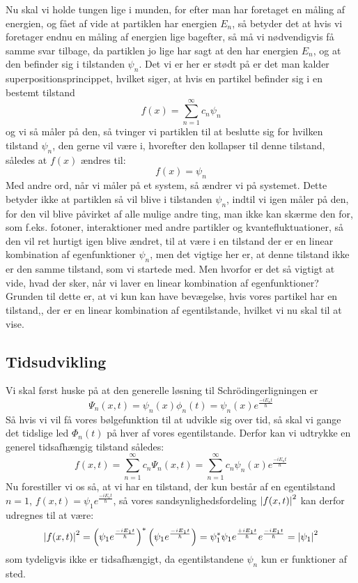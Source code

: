 \documentclass[../Kvantemekanik.tex]{subfiles}
\begin{document}
Nu skal vi holde tungen lige i munden, for efter man har foretaget en måling af energien, og fået af vide at partiklen har energien $E_n$, så betyder det at hvis vi foretager endnu en måling af energien lige bagefter, så må vi nødvendigvis få samme svar tilbage, da partiklen jo lige har sagt at den har energien $E_n$, og at den befinder sig i tilstanden $\psi_n$.
Det vi er her er stødt på er det man kalder superpositionsprincippet, hvilket siger, at hvis en partikel befinder sig i en bestemt tilstand
\begin{equation*}
    f(x)=\sum_{n=1}^{\infty}c_n\psi_n
\end{equation*}
og vi så måler på den, så tvinger vi partiklen til at beslutte sig for hvilken tilstand $\psi_n$, den gerne vil være i, hvorefter den kollapser til denne tilstand, således at $f(x)$ ændres til:
\begin{equation*}
    f(x)=\psi_n
\end{equation*}
Med andre ord, når vi måler på et system, så ændrer vi på systemet. Dette betyder ikke at partiklen så vil blive i tilstanden $\psi_n$, indtil vi igen måler på den, for den vil blive påvirket af alle mulige andre ting, man ikke kan skærme den for, som f.eks. fotoner, interaktioner med andre partikler og kvantefluktuationer, så den vil ret hurtigt igen blive ændret, til at være i en tilstand der er en linear kombination af egenfunktioner $\psi_n$, men det vigtige her er, at denne tilstand ikke er den samme tilstand, som vi startede med. 
Men hvorfor er det så vigtigt at vide, hvad der sker, når vi laver en linear kombination af egenfunktioner? Grunden til dette er, at vi kun kan have bevægelse, hvis vores partikel har en tilstand,, der er en linear kombination af egentilstande, hvilket vi nu skal til at vise.
\subsection{Tidsudvikling}
Vi skal først huske på at den generelle løsning til Schrödingerligningen er
$$\Psi_n(x,t)=\psi_n(x)\phi_n(t)=\psi_n(x)e^{\frac{-iE_nt}{\hbar}}$$
Så hvis vi vil få vores bølgefunktion til at udvikle sig over tid, så skal vi gange det tidslige led $\Phi_n(t)$ på hver af vores egentilstande. Derfor kan vi udtrykke en generel tidsafhængig tilstand således:
\begin{equation}
    f(x,t)=\sum_{n=1}^{\infty}c_n\Psi_n(x,t)=\sum_{n=1}^{\infty}c_n\psi_n(x)e^{\frac{-iE_nt}{\hbar}}
\end{equation}
Nu forestiller vi os så, at vi har en tilstand, der kun består af en egentilstand $n=1$, $f(x,t)=\psi_1e^{\frac{-iE_1t}{\hbar}}$, så vores sandsynlighedsfordeling $\left| f(x,t) \right|^2$ kan derfor udregnes til at være:
\begin{equation*}
    \left| f(x,t) \right|^2=\left(\psi_1e^{\frac{-iE_1t}{\hbar}}\right)^{*}\left(\psi_1e^{\frac{-iE_1t}{\hbar}}\right)=\psi_1^{*}\psi_1 e^{\frac{+iE_1t}{\hbar}}e^{\frac{-iE_1t}{\hbar}}=\left| \psi_1 \right|^{2}
\end{equation*}
som tydeligvis ikke er tidsafhængigt, da egentilstandene $\psi_n$ kun er funktioner af sted.
\end{document}
